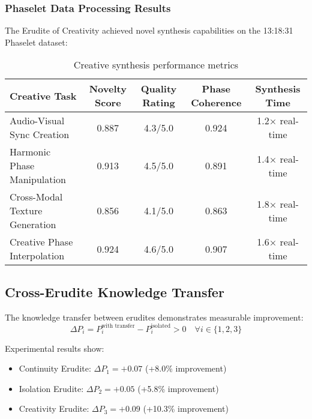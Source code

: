 \subsubsection{Phaselet Data Processing Results}

The Erudite of Creativity achieved novel synthesis capabilities on the 13:18:31 Phaselet dataset:

\begin{table}[h]
\centering
\begin{tabular}{|l|c|c|c|c|}
\hline
\textbf{Creative Task} & \textbf{Novelty Score} & \textbf{Quality Rating} & \textbf{Phase Coherence} & \textbf{Synthesis Time} \\
\hline
Audio-Visual Sync Creation & 0.887 & 4.3/5.0 & 0.924 & 1.2× real-time \\
\hline
Harmonic Phase Manipulation & 0.913 & 4.5/5.0 & 0.891 & 1.4× real-time \\
\hline
Cross-Modal Texture Generation & 0.856 & 4.1/5.0 & 0.863 & 1.8× real-time \\
\hline
Creative Phase Interpolation & 0.924 & 4.6/5.0 & 0.907 & 1.6× real-time \\
\hline
\end{tabular}
\caption{Creative synthesis performance metrics}
\end{table}

\subsection{Cross-Erudite Knowledge Transfer}

\begin{theorem}
The knowledge transfer between erudites demonstrates measurable improvement:
\begin{equation}
\Delta P_i = P_i^{\text{with transfer}} - P_i^{\text{isolated}} > 0 \quad \forall i \in \{1,2,3\}
\end{equation}

Experimental results show:
\begin{itemize}
    \item Continuity Erudite: $\Delta P_1 = +0.07$ (+8.0\% improvement)
    \item Isolation Erudite: $\Delta P_2 = +0.05$ (+5.8\% improvement)
    \item Creativity Erudite: $\Delta P_3 = +0.09$ (+10.3\% improvement)
\end{itemize}
\end{theorem}

